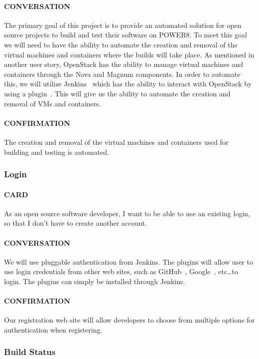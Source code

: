 \documentclass[10pt,letterpaper,onecolumn,draftclsnofoot]{IEEEtran}
\begin{document}
\paragraph{CONVERSATION}
The primary goal of this project is to provide an automated solution for open source projects to build and test their software on POWER8.
To meet this goal we will need to have the ability to automate the creation and removal of the virtual machines and containers where the builds will take place.
As mentioned in another user story, OpenStack has the ability to manage virtual machines and containers through the Nova and Magnum components.
In order to automate this, we will utilize Jenkins~\cite{jenkinsmain} which has the ability to interact with OpenStack by using a plugin~\cite{jcloudsplugin}.
This will give us the ability to automate the creation and removal of VMs and containers.
\paragraph{CONFIRMATION}
The creation and removal of the virtual machines and containers used for building and testing is automated.

\subsubsection{Login}
\paragraph{CARD}
As an open source software developer, I want to be able to use an existing login, so that I don't have to create another account.
\paragraph{CONVERSATION}
We will use pluggable authentication from Jenkins. The plugins will allow user to use login credentials from other web sites, such as GitHub~\cite{githublogin}, Google~\cite{googlelogin}, etc\ldots to login. The plugins can simply be installed through Jenkins.
\paragraph{CONFIRMATION}
Our registration web site will allow developers to choose from multiple options for authentication when registering.

\subsubsection{Build Status}
\end{document}
